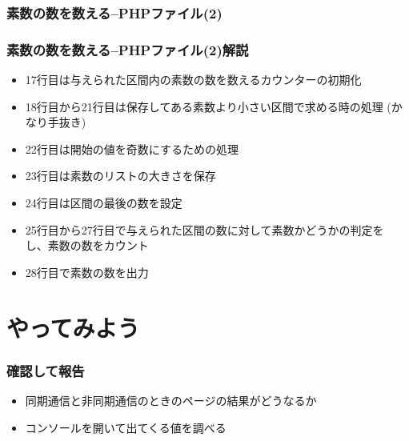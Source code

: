 \begin{frame}[containsverbatim]
 \frametitle{素数の数を数える--PHPファイル(2)}
\end{frame}
\begin{frame}[containsverbatim]
 \frametitle{素数の数を数える--PHPファイル(2)解説}
 \begin{itemize}
  \item 17行目は与えられた区間内の素数の数を数えるカウンターの初期化
  \item 18行目から21行目は保存してある素数より小さい区間で求める時の処理
        (かなり手抜き)
  \item 22行目は開始の値を奇数にするための処理
  \item 23行目は素数のリストの大きさを保存
  \item 24行目は区間の最後の数を設定
  \item 25行目から27行目で与えられた区間の数に対して素数かどうかの判定を
        し、素数の数をカウント
  \item 28行目で素数の数を出力
 \end{itemize}
\end{frame}
 \section{やってみよう}
\begin{frame}[containsverbatim]
 \frametitle{確認して報告}
 \begin{itemize}
  \item 同期通信と非同期通信のときのページの結果がどうなるか
  \item コンソールを開いて出てくる値を調べる
 \end{itemize}
\end{frame}

\begin{frame}[containsverbatim]
\frametitle{}
\end{frame}

